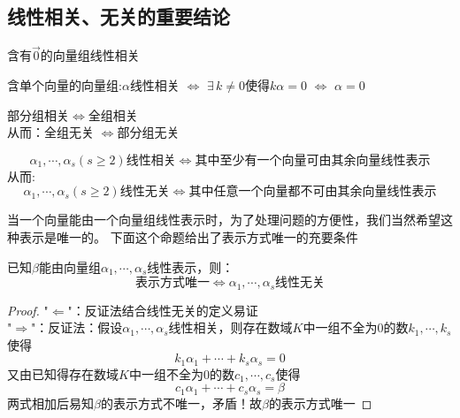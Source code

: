 \subsection*{线性相关、无关的重要结论}
\begin{proposition}
    含有$\vec{0}$的向量组线性相关
\end{proposition}

\begin{proposition}
    含单个向量的向量组:$\alpha$线性相关 $\Leftrightarrow$ $\exists \, k \neq 0$使得$k\alpha = 0$
    $\Leftrightarrow$ $\alpha = 0$
\end{proposition}

\begin{proposition}[部分组与全组的线性相关性的联系]
    部分组相关$\Leftrightarrow$全组相关\\
    从而：全组无关 $\Leftrightarrow$部分组无关
\end{proposition}

\begin{proposition}[线性相关与线性表示的联系]
    \begin{equation*}
        \alpha_1, \cdots, \alpha_s(s \geq 2)\text{线性相关} \Leftrightarrow \text{其中至少有一个向量可由其余向量线性表示}
    \end{equation*}
    从而:
    \begin{equation*}
        \alpha_1, \cdots, \alpha_s(s \geq 2)\text{线性无关} \Leftrightarrow \text{其中任意一个向量都不可由其余向量线性表示}
    \end{equation*}
\end{proposition}

当一个向量能由一个向量组线性表示时，为了处理问题的方便性，我们当然希望这种表示是唯一的。
下面这个命题给出了表示方式唯一的充要条件
\begin{proposition}
    已知$\beta$能由向量组$\alpha_1, \cdots, \alpha_s$线性表示，则：
    \begin{equation*}
        \text{表示方式唯一} \Leftrightarrow \alpha_1, \cdots, \alpha_s \text{线性无关}
    \end{equation*}
\end{proposition}

\begin{proof}
    "$\Leftarrow$"：反证法结合线性无关的定义易证\\
    "$\Rightarrow$"：反证法：假设$\alpha_1, \cdots, \alpha_s$线性相关，则存在数域$K$中一组不全为$0$的数$k_1, \cdots, k_s$使得
    \begin{equation*}
        k_1\alpha_1 + \cdots + k_s\alpha_s = 0
    \end{equation*}
    又由已知得存在数域$K$中一组不全为$0$的数$c_1, \cdots, c_s$使得
    \begin{equation*}
        c_1\alpha_1 + \cdots + c_s\alpha_s = \beta
    \end{equation*}
    两式相加后易知$\beta$的表示方式不唯一，矛盾！故$\beta$的表示方式唯一
\end{proof}

